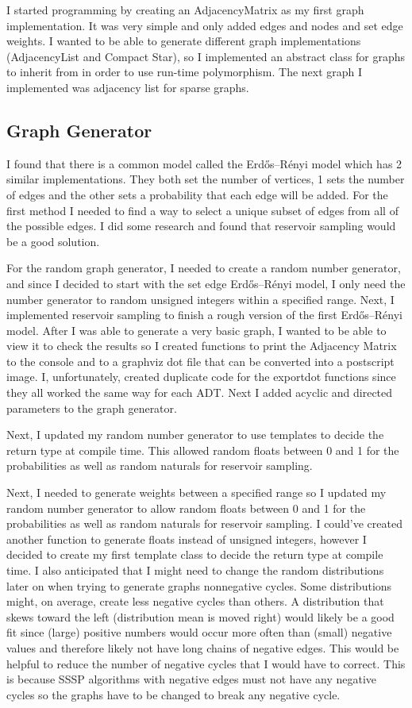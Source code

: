 \documentclass{article}
\begin{document}
I started programming by creating an AdjacencyMatrix as my first graph implementation. It was very simple and only added edges and nodes and set edge weights. I wanted to be able to generate different graph implementations (AdjacencyList and Compact Star), so I implemented an abstract class for graphs to inherit from in order to use run-time polymorphism. The next graph I implemented was adjacency list for sparse graphs. 

\subsection{Graph Generator}
I found that there is a common model called the Erdős–Rényi model which has 2 similar implementations. They both set the number of vertices, 1 sets the number of edges and the other sets a probability that each edge will be added. For the first method I needed to find a way to select a unique subset of edges from all of the possible edges. I did some research and found that reservoir sampling would be a good solution. 

For the random graph generator, I needed to create a random number generator, and since I decided to start with the set edge Erdős–Rényi model, I only need the number generator to random unsigned integers within a specified range. Next, I implemented reservoir sampling to finish a rough version of the first Erdős–Rényi model. After I was able to generate a very basic graph, I wanted to be able to view it to check the results so I created functions to print the Adjacency Matrix to the console and to a graphviz dot file that can be converted into a postscript image. I, unfortunately, created duplicate code for the exportdot functions since they all worked the same way for each ADT. Next I added acyclic and directed parameters to the graph generator.

Next, I updated my random number generator to use templates to decide the return type at compile time. This allowed random floats between 0 and 1 for the probabilities as well as random naturals for reservoir sampling.

Next, I needed to generate weights between a specified range so I updated my random number generator to allow random floats between 0 and 1 for the probabilities as well as random naturals for reservoir sampling. I could've created another function to generate floats instead of unsigned integers, however I decided to create my first template class to decide the return type at compile time. I also anticipated that I might need to change the random distributions later on when trying to generate graphs nonnegative cycles. Some distributions might, on average, create less negative cycles than others. A distribution that skews toward the left (distribution mean is moved right) would likely be a good fit since (large) positive numbers would occur more often than (small) negative values and therefore likely not have long chains of negative edges. This would be helpful to reduce the number of negative cycles that I would have to correct. This is because SSSP algorithms with negative edges must not have any negative cycles so the graphs have to be changed to break any negative cycle.
\end{document}
